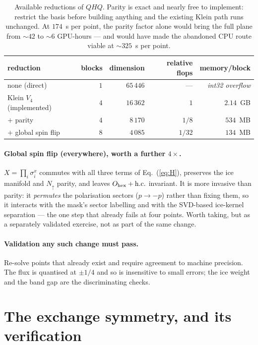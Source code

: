 \documentclass[11pt]{article}
\newcommand{\Ohex}{O_{\rm hex}}
\begin{document}
\begin{table}[h]
\centering
\small
\begin{tabular}{lrrrr}
\toprule
reduction & blocks & dimension & relative flops & memory/block\\
\midrule
none (direct) & $1$ & $65\,446$ & --- & \emph{int32 overflow}\\
Klein $V_4$ (implemented) & $4$ & $16\,362$ & $1$ & $2.14$~GB\\
$+$ parity & $4$ & $8\,170$ & $1/8$ & $534$~MB\\
$+$ global spin flip & $8$ & $4\,085$ & $1/32$ & $134$~MB\\
\bottomrule
\end{tabular}
\caption{Available reductions of $QHQ$.  Parity is exact and nearly free to
implement: restrict the basis before building anything and the existing
Klein path runs unchanged.  At $174$~s per point, the parity factor alone
would bring the full plane from $\sim42$ to $\sim6$ GPU-hours --- and would
have made the abandoned CPU route viable at $\sim325$~s per point.}
\label{tab:reductions}
\end{table}

\paragraph{Global spin flip (everywhere), worth a further $4\times$.}
$X=\prod_i\sigma^x_i$ commutes with all three terms of Eq.~(\ref{eq:H}),
preserves the ice manifold and $N_\uparrow$ parity, and leaves
$\Ohex+\mathrm{h.c.}$ invariant.  It is more invasive than parity: it
\emph{permutes} the polarisation sectors ($p\to-p$) rather than fixing
them, so it interacts with the mask's sector labelling and with the
SVD-based ice-kernel separation --- the one step that already fails at four
points.  Worth taking, but as a separately validated exercise, not as part
of the same change.

\paragraph{Validation any such change must pass.}  Re-solve points that
already exist and require agreement to machine precision.  The flux is
quantised at $\pm1/4$ and so is insensitive to small errors; the ice weight
and the band gap are the discriminating checks.

\section{The exchange symmetry, and its verification}
\label{sec:symmetry}
\end{document}
